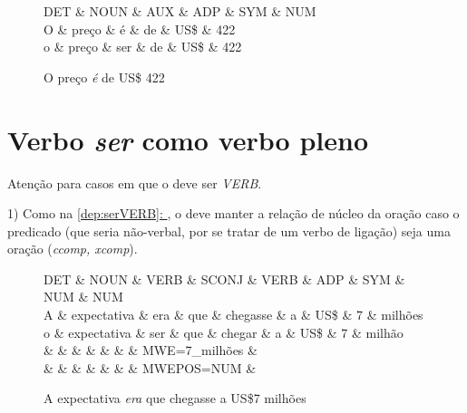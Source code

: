 \documentclass[output=paper,colorlinks,citecolor=brown]{langscibook}
\newcommand*{\fullref}[1]{\hyperref[{#1}]{\autoref*{#1}: \nameref*{#1}}} %
\begin{document}
\begin{figure}[htbp]
    \centering
    \vspace{.8cm}
    \begin{dependency}
    \begin{deptext}
    DET \& NOUN \& AUX \& ADP \& SYM \& NUM \\
    O \& preço \& é \& de \& US\$ \& 422 \\
    o \& preço \& ser \& de \& US\$ \& 422 \\
    \end{deptext}
    \end{dependency}
    \caption{O preço \emph{é} de US\$ 422}\label{dep:serAUX}
\end{figure}

\section{Verbo \textit{ser} como verbo pleno}\label{sec:serpleno}

Atenção para casos em que o  deve ser \textit{VERB}.

1) Como na \fullref{dep:serVERB}, o  deve manter a relação de núcleo da oração caso o predicado (que seria não-verbal, por se tratar de um verbo de ligação) seja uma oração (\textit{ccomp, xcomp}).

\begin{figure}[htbp]
    \centering
    \vspace{.8cm}
    \begin{dependency}
    \begin{deptext}
    DET \& NOUN \& VERB \& SCONJ \& VERB \& ADP \& SYM \& NUM \& NUM \\
    A \& expectativa \& era \& que \& chegasse \& a \& US\$ \& 7 \& milhões \\
    o \& expectativa \& ser \& que \& chegar \& a \& US\$ \& 7 \& milhão \\
    \& \& \& \& \& \& \& MWE=7\_milhões \& \\
    \& \& \& \& \& \& \& MWEPOS=NUM \& \\
    \end{deptext}
    \end{dependency}
    \caption{A expectativa \emph{era} que chegasse a US\$7 milhões}\label{dep:serVERB}
\end{figure}
\end{document}
